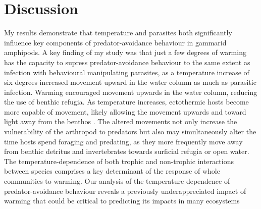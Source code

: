 \section{Discussion}

My results demonstrate that temperature and parasites both significantly influence key components of predator-avoidance behaviour in gammarid amphipods. A key finding of my study was that just a few degrees of warming has the capacity to supress predator-avoidance behaviour to the same extent as infection with behavioural manipulating parasites, as a temperature increase of six degrees increased movement upward in the water column as much as parasitic infection. Warming encouraged movement upwards in the water column, reducing the use of benthic refugia. As temperature increases, ectothermic hosts become more capable of movement, likely allowing the movement upwards and toward light away from the benthos \citep{pawar2016, abram2017}. The altered movements not only increase the vulnerability of the arthropod to predators \citep{perrot2012} but also may simultaneously alter the time hosts spend foraging and predating, as they more frequently move away from benthic detritus and invertebrates towards surficial refugia or open water. The temperature-dependence of both trophic  and non-trophic \citep{kordas2017} interactions between species comprises a key determinant of the response of whole communities to warming. Our analysis of the temperature dependence of predator-avoidance behaviour reveals a previously underappreciated impact of warming that could be critical to predicting its impacts in many ecosystems

